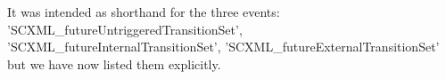 \documentclass{response}
\begin{document}
\begin{comment}{Reviewer \#3}
  Page 12:

* I had a hard time reading this.
\end{comment}

\begin{response}
\end{response}

\begin{comment}{Reviewer \#3}
  Page 14:

* Mid: "SCXML future..TransitionSet" - is this correct?
\end{comment}

\begin{response}
	It was intended as shorthand for the three events: 'SCXML\_futureUntriggeredTransitionSet', 'SCXML\_futureInternalTransitionSet', 'SCXML\_futureExternalTransitionSet' but we have now listed them explicitly.
\end{response}
\end{document}
